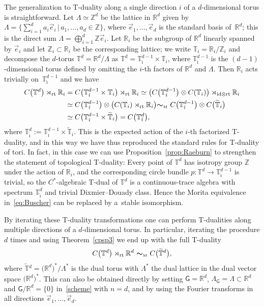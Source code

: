 \documentclass[pdftex]{sigma}
\numberwithin{equation}{section}
\def\nn{\nonumber}
\newcommand{\mbf}[1]{{\boldsymbol {#1} }}
\def\Id{{\rm id}}
\newcommand{\sfG}{\mathsf{G}}
\newcommand{\rt}{{\rm rt}}
\newcommand{\zed}{{\mathbb Z}} %
\newcommand{\real}{{\mathbb R}} %
\newcommand{\torus}{{\mathbb T}} %
\def\nn{\nonumber}
\begin{document}
The generalization to T-duality along a single direction $i$ of a
$d$-dimensional torus is
straightforward. Let $\Lambda\simeq\zed^d$ be the lattice in $\real^d$ given by
$\Lambda=\big\{\sum_{i=1}^d a_i \vec e_i \, | \, a_1,\dots,a_d \in
\zed\big\}$, where $\vec e_1,\dots,\vec e_d$ is the standard basis of~$\real^d$; this is the direct
sum $\Lambda=\bigoplus_{i=1}^d \zed\vec e_i$.
Let $\real_i$ be the subgroup of $\real^d$ linearly spanned by
$\vec e_i$ and let $\zed_i\subset\real_i$ be the corresponding
lattice; we write $\torus_i=\real_i/\zed_i$ and decompose the
$d$-torus $\torus^d=\real^d/\Lambda$ as
$\torus^d=\torus^{d-1}_{\hat\imath}\times\torus_i$, where
$\torus^{d-1}_{\hat\imath}$ is the $(d{-}1)$-dimensional torus defined by
omitting the $i$-th factors of $\real^d$ and $\Lambda$. Then $\real_i$
acts trivially on~$\torus^{d-1}_{\hat\imath}$ and we have
\begin{align}
C\big(\torus^d\big)\rtimes_\rt\real_i &=
C\big(\torus^{d-1}_{\hat\imath}\times \torus_{i}\big) \rtimes_\rt\real_i
\simeq \big(C\big(\torus^{d-1}_{\hat\imath}\big)\otimes
C(\torus_{i}) \big)\rtimes_{\Id\otimes\rt}\real_i\nn\\
&\simeq
C\big(\torus^{d-1}_{\hat\imath}\big)\otimes
\big(C(\torus_{i}) \rtimes_\rt\real_i \big)
 \mbf\sim_{\text{\tiny M}} \
C\big(\torus^{d-1}_{\hat\imath}\big)\otimes
C\big(\widetilde\torus_{i}\big) \nn\\
&\simeq
C\big(\torus^{d-1}_{\hat\imath}\times \widetilde\torus_{i}\big)
 = C\big(\torus^d_{\tilde\imath}\big) ,
\label{eq:Buscher}\end{align}
where $\torus^d_{\tilde\imath}:=\torus^{d-1}_{\hat\imath}\times
\widetilde\torus_{i}$.
This is the expected action of the $i$-th factorized T-duality, and in
this way we have thus
reproduced the standard rules for T-duality of tori. In fact, in this case we can use
Proposition~\ref{prop:Raeburn} to strengthen the statement of topological
T-duality: Every point of $\torus^d$ has isotropy group $\zed$ under
the action of $\real_i$, and the corresponding circle bundle
$p\colon \torus^d\to\torus^{d-1}_{\hat\imath}$ is trivial, so the
$C^*$-algebraic T-dual of $\torus^{d}$ is a continuous-trace algebra
with spectrum $\torus^d_{\tilde\imath}$ and trivial Dixmier--Douady
class. Hence the Morita equivalence in~\eqref{eq:Buscher} can be
replaced by a~stable isomorphism.

By iterating these T-duality transformations
one can perform T-dualities along multiple directions of a
$d$-dimensional torus. In particular, iterating the procedure $d$
times and using Theorem~\ref{cpsp3} we end up with the full T-duality
\begin{gather}\label{eq:fullTduality}
C\big(\torus^d\big)\rtimes_\rt\real^d \ \mbf\sim_{\text{\tiny M}} \
C\big(\widetilde\torus{}^d\big) ,
\end{gather}
where $\widetilde\torus{}^d=\big(\real^d\big)^*/\Lambda^*$ is the dual
torus with $\Lambda^*$ the dual lattice in the dual vector space $\big(\real^d\big)^*$.
This can also be obtained directly by setting $\sfG
=\real^d$, $\Lambda_\sfG=\Lambda\subset
\real^d$ and $\sfG/\real^d=\{0\}$ in~\eqref{scheme} with $n=d$, and by using the Fourier transforms in
all directions $\vec e_1,\dots,\vec e_d$.
\end{document}
